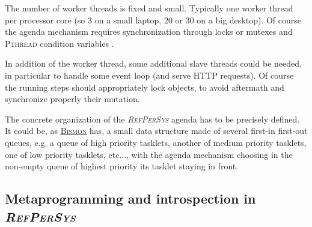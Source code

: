\documentclass[11pt,a4paper,svgnames]{article}
\newcommand{\RefPerSys}{{\textit{\textsc{RefPerSys}}}}
\begin{document}
The number of worker threads is fixed and small. Typically one worker
thread per processor core (so 3 on a small laptop, 20 or 30 on a big
desktop). Of course the agenda mechanism requires synchronization through
locks or mutexes and \textsc{Pthread} condition variables
\cite{barney:2010:pthreads}.

In addition of the worker thread, some additional slave threads could
be needed, in particular to handle some event loop (and serve HTTP
requests).  Of course the running steps should appropriately lock
objects, to avoid aftermath and synchronize properly their mutation.


The concrete organization of the {\RefPerSys} agenda has to be
precisely defined. It could be, as
\href{http://github.com/bstarynk/bismon}{\textsc{Bismon}} has, a small
data structure made of several first-in first-out queues, e.g. a queue
of high priority tasklets, another of medium priority tasklets, one of
low priority tasklets, etc..., with the agenda mechanism choosing in
the non-empty queue of highest priority its tasklet staying in front.

\bigskip

\subsection{Metaprogramming and introspection in \RefPerSys}
\label{subsec:metaprog-introspec}
\end{document}
